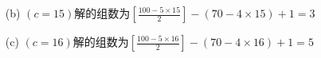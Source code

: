 \documentclass[UTF8]{ctexart}
\begin{document}
\begin{enumerate}
\begin{enumerate}
            \begin{comment}
            \[
                \begin{cases}
                    a&=0;\\
                    b&=15;\\
                    c&=14;
                \end{cases}
                \quad
                \begin{cases}
                    a&=2;\\
                    b&=14;\\
                    c&=14.
                \end{cases}
            \]\end{comment}
            \item [(b)]$(c=15)$解的组数为$\left[\displaystyle{\frac{100-5\times 15}{2}}\right]-(70-4\times 15)+1=3$
            \begin{comment}
            \[
                \begin{cases}
                    a&=1;\\
                    b&=12;\\
                    c&=15;
                \end{cases}
                \quad
                \begin{cases}
                    a&=3 ;\\
                    b&=11 ;\\
                    c&=15 ;
                \end{cases}
                \quad
                \begin{cases}
                    a&=5 ;\\
                    b&=10 ;\\
                    c&=15 .
                \end{cases}
            \]\end{comment}
            \item [(c)]$(c=16)$解的组数为$\left[\displaystyle{\frac{100-5\times 16}{2}}\right]-(70-4\times 16)+1=5$
            \begin{comment}
            \[
                \begin{cases}
                    a&=0 ;\\
                    b&=10 ;\\
                    c&=16 ;
                \end{cases}
                \quad

\end{comment}
\end{enumerate}
\end{enumerate}
\end{document}
